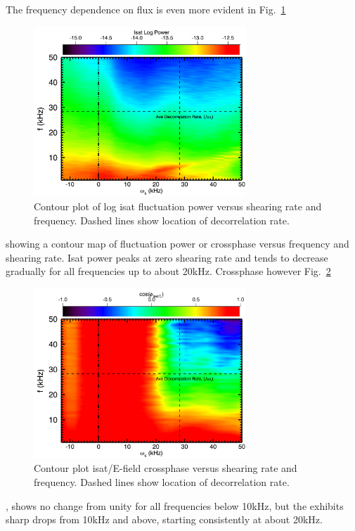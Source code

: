 \documentclass[%
 aip,
 amsmath,amssymb,
 preprint,%
]{revtex4-1}
\begin{document}
The frequency dependence on flux is even more evident in
Fig.~\ref{fig:powercontour}
\begin{figure}
\begin{center}
\includegraphics[width=8cm]{powercontour.png}%
\end{center}
\caption{\label{fig:powercontour} Contour plot of log isat fluctuation power versus shearing rate and frequency. Dashed lines show location of decorrelation rate.}
\end{figure}
showing a contour map of fluctuation power or crossphase versus frequency and shearing rate. Isat power peaks at zero shearing rate and tends to decrease gradually for all frequencies up to about 20kHz. Crossphase however 
Fig.~\ref{fig:cpcontour}
\begin{figure}
\begin{center}
\includegraphics[width=8cm]{cpcontour.png}%
\end{center}
\caption{\label{fig:cpcontour} Contour plot isat/E-field crossphase versus shearing rate and frequency. Dashed lines show location of decorrelation rate.}
\end{figure}
, shows no change from unity for all frequencies below 10kHz, but the exhibits sharp drops from 10kHz and above, starting consistently at about 20kHz. 
\end{document}
